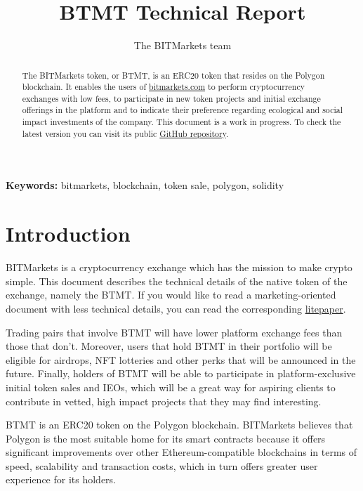 \documentclass[a4paper,12pt]{article}
\title{BTMT Technical Report}
\author{The BITMarkets team}
\providecommand{\keywords}[1]{\textbf{Keywords: } #1}
\begin{document}
\maketitle

\begin{abstract}

The BITMarkets token, or BTMT, is an ERC20 token that resides on the Polygon blockchain. It enables the users of \href{https://bitmarkets.com}{bitmarkets.com} to perform cryptocurrency exchanges with low fees,
to participate in new token projects and initial exchange offerings in the platform and to
indicate their preference regarding ecological and social impact investments of the company.
This document is a work in progress. To check the latest version you can visit its public \href{https://github.com/UAB-BITmarkets/whitepaper}{GitHub repository}.

\end{abstract}

\keywords{bitmarkets, blockchain, token sale, polygon, solidity}

\section{Introduction}

BITMarkets is a cryptocurrency exchange which has the mission to make crypto simple.
This document describes the technical details of the native token of the exchange, namely the BTMT.
If you would like to read a marketing-oriented document with less technical details, you can read the corresponding \href{https://bitmarkets.com}{litepaper}.

Trading pairs that involve BTMT will have lower platform exchange fees than those that don't.
Moreover, users that hold BTMT in their portfolio will be eligible for airdrops, NFT lotteries and other perks that will be announced in the future.
Finally, holders of BTMT will be able to participate in platform-exclusive initial token sales and IEOs,
which will be a great way for aspiring clients to contribute in vetted, high impact projects that they may find interesting.

BTMT is an ERC20 token on the Polygon blockchain. BITMarkets believes that Polygon is the most suitable home for its smart contracts because it offers significant improvements over other Ethereum-compatible blockchains in terms of speed, scalability and transaction costs, which in turn offers greater user experience for its holders.
\end{document}

